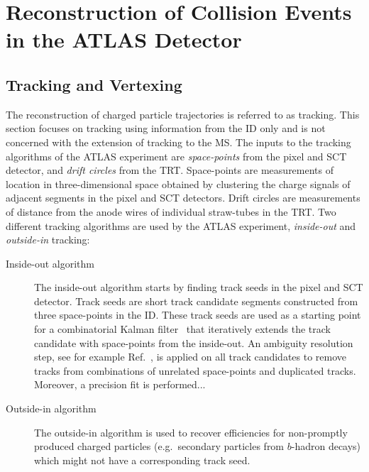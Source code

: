 \section{Reconstruction of Collision Events in the ATLAS Detector}%
\label{sec:object_reco_at_atlas}



\subsection{Tracking and Vertexing}

The reconstruction of charged particle trajectories is referred to as
tracking. This section focuses on tracking using information from the ID only
and is not concerned with the extension of tracking to the MS. The inputs to the
tracking algorithms of the ATLAS experiment are \emph{space-points} from the
pixel and SCT detector, and \emph{drift circles} from the TRT. Space-points are
measurements of location in three-dimensional space obtained by clustering the
charge signals of adjacent segments in the pixel and SCT detectors. Drift
circles are measurements of distance from the anode wires of individual
straw-tubes in the TRT. Two different tracking algorithms are used by the ATLAS
experiment, \emph{inside-out} and \emph{outside-in} tracking:
\begin{description}

\item[Inside-out algorithm] The inside-out algorithm starts by finding track
  seeds in the pixel and SCT detector. Track seeds are short track candidate
  segments constructed from three space-points in the ID. These track seeds are
  used as a starting point for a combinatorial Kalman filter~
  that iteratively extends the track candidate with space-points from the
  inside-out. An ambiguity resolution step, see for example
  Ref.~\cite{PERF-2015-08}, is applied on all track candidates to remove tracks
  from combinations of unrelated space-points and duplicated tracks. Moreover, a
  precision fit is performed...  

\item[Outside-in algorithm] The outside-in algorithm is used to recover
  efficiencies for non-promptly produced charged particles (e.g.\ secondary
  particles from $b$-hadron decays) which might not have a corresponding track
  seed.

\end{description}

